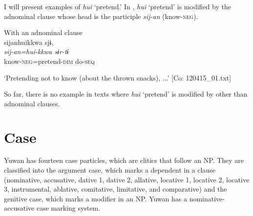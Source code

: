 I will present examples of \textit{hui} ‘pretend.’ In , \textit{hui} ‘pretend’ is modified by the adnominal clause whose head is the participle \textit{sij-an} (know-\textsc{neg}).

\ea\label{ex:6-29}
 With an adnominal clause\\

{\TM}
\glll sijanhuikkwa  sjɨ,\\
\textit{sij-an=hui-kkwa  sɨr-tɨ}\\

    know-\textsc{neg}=pretend-\textsc{dim}  do-\textsc{seq}

\glt    ‘Pretending not to know (about the thrown snacks), ...’ [Co: 120415\_01.txt]
\z

So far, there is no example in texts where \textit{hui} ‘pretend’ is modified by other than adnominal clauses.

\section{ Case}

Yuwan has fourteen case particles, which are clitics that follow an NP. They are classified into the argument case, which marks a dependent in a clause (nominative, accusative, dative 1, dative 2, allative, locative 1, locative 2, locative 3, instrumental, ablative, comitative, limitative, and comparative) and the genitive case, which marks a modifier in an NP. Yuwan has a nominative-accusative case marking system.

